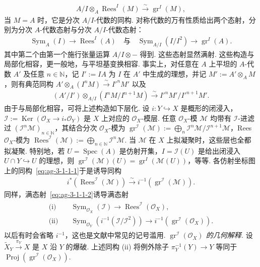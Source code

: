 \begin{numpara}[$I$-进滤过]
\begin{align}
A/I\otimes_A\operatorname{Rees}^{I}(M)\xrightarrow\sim\operatorname{gr}^{I}(M),\tag{3.1.1.1}\label{eq:ag-3-1-1-1}
\end{align}
当 $M=A$ 时，它是分次 $A/I$-代数的同构.
对称代数的万有性质给出两个态射，分别为分次 $A$-代数态射与分次 $A/I$-代数态射：
\begin{align}
\operatorname{Sym}_A(I)\longrightarrow\operatorname{Rees}^{I}(A)
\quad\text{与}\quad
\operatorname{Sym}_{A/I}(I/I^2)\longrightarrow\operatorname{gr}^{I}(A).\tag{3.1.1.2}\label{eq:ag-3-1-1-2}
\end{align}
其中第二个由第一个施行张量运算 $A/I\otimes-$ 得到. 这些态射显然满射.
这些构造与局部化相容，更一般地，与平坦基变换相容. 事实上，对任意在 $A$ 上平坦的 $A$-代数 $A'$ 及任意 $n\in\mathbb N$，记 $I':=IA$ 为 $I$ 在 $A'$ 中生成的理想，并记 $M':=A'\otimes_AM$，则有典范同构 $A'\otimes_A(I^nM)\xrightarrow\sim I'^nM'$ 以及
\begin{align}
(A'/I')\otimes_{A/I}(I^nM/I^{n+1}M)\xrightarrow\sim I'^nM'/I'^{n+1}M'.\tag{3.1.1.3}\label{eq:ag-3-1-1-3}
\end{align}
由于与局部化相容，可将上述构造如下层化. 设 $i:Y\hookrightarrow X$ 是概形的闭浸入，$\mathcal I:=\operatorname{Ker}(\mathcal O_X\longrightarrow i_*\mathcal O_Y)$ 是 $X$ 上对应的 $\mathcal O_X$-模层. 任意 $\mathcal O_X$-模 $\mathcal M$ 均带有 $\mathcal I$-进滤过 $(\mathcal I^n\mathcal M)_{n\in\mathbb N}$，其结合分次 $\mathcal O_X$-模为 $\operatorname{gr}^{\mathcal I}(\mathcal M):=\bigoplus_n\mathcal I^n\mathcal M/\mathcal I^{n+1}\mathcal M$，Rees $\mathcal O_X$-模为 $\operatorname{Rees}^{\mathcal I}(\mathcal M):=\bigoplus_{n\in\mathbb N}\mathcal I^n\mathcal M$. 当 $\mathcal M$ 在 $X$ 上拟凝聚时，这些层也全都拟凝聚. 特别地，若 $U=\operatorname{Spec}(A)$ 是仿射开集，$I=\mathcal I(U)$ 是给出闭浸入 $U\cap Y\hookrightarrow U$ 的理想，则 $\operatorname{gr}^{\mathcal I}(\mathcal M)(U)=\operatorname{gr}^{I}(\mathcal M(U))$，等等. 各仿射坐标图上的同构~\eqref{eq:ag-3-1-1-1}于是诱导同构
\begin{align}
i^*(\operatorname{Rees}^{\mathcal I}(\mathcal M))\xrightarrow\sim i^{-1}(\operatorname{gr}^{\mathcal I}(\mathcal M)).\tag{3.1.1.4}\label{eq:ag-3-1-1-4}
\end{align}
同样，满态射~\eqref{eq:ag-3-1-1-2}诱导满态射
\begin{align}
\begin{aligned}
\text{(i)}\quad&\operatorname{Sym}_{\mathcal O_X}(\mathcal I)\longrightarrow\operatorname{Rees}^{\mathcal I}(\mathcal O_X),\\
\text{(ii)}\quad&\operatorname{Sym}_{\mathcal O_Y}(i^{-1}(\mathcal I/\mathcal I^2))\longrightarrow i^{-1}(\operatorname{gr}^{\mathcal I}(\mathcal O_X)).
\end{aligned}\tag{3.1.1.5}\label{eq:ag-3-1-1-5}
\end{align}
以后有时会省略 $i^{-1}$，这也是文献中常见的记号滥用.
\emph{$\operatorname{gr}^{\mathcal I}(\mathcal O_X)$ 的几何解释.} 设 $\widetilde X_Y\xrightarrow{\pi_Y}X$ 是 $X$ 沿 $Y$ 的爆破. 上述同构 (ii) 将例外除子 $\pi_Y^{-1}(Y)\longrightarrow Y$ 等同于 $\operatorname{Proj}(\operatorname{gr}^{\mathcal I}(\mathcal O_X))$.
\end{numpara}
